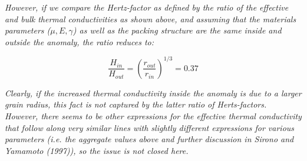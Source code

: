 \documentclass[11pt]{article} %
\begin{document}
	\emph{However, if we compare the Hertz-factor as defined by the ratio of the effective and bulk thermal conductivities as shown above, and assuming that the materials parameters ($\mu, E, \gamma$) as well as the packing structure are the same inside and outside the anomaly, the ratio reduces to:}
	
	\begin{equation}
	\frac{H_{in}}{H_{out}} = (\frac{r_{out}}{r_{in}})^{1/3} = 0.37
	\end{equation}
	
	\emph{Clearly, if the increased thermal conductivity inside the anomaly is due to a larger grain radius, this fact is not captured by the latter ratio of Herts-factors. However, there seems to be other expressions for the effective thermal conductivity that follow along very similar lines with slightly different expressions for various parameters (i.e. the aggregate values above and further discussion in Sirono and Yamamoto (1997)), so the issue is not closed here. }

	
	
\end{document}
